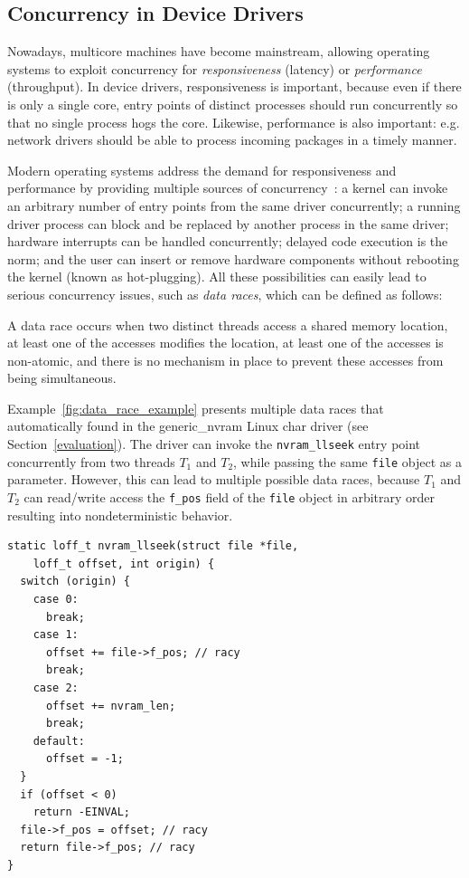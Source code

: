 \subsection{Concurrency in Device Drivers}
\label{bg:concurrency}

Nowadays, multicore machines have become mainstream, allowing operating systems to exploit concurrency for \emph{responsiveness} (latency) or \emph{performance} (throughput). In device drivers, responsiveness is important, because even if there is only a single core, entry points of distinct processes should run concurrently so that no single process hogs the core. Likewise, performance is also important: e.g. network drivers should be able to process incoming packages in a timely manner.

Modern operating systems address the demand for responsiveness and performance by providing multiple sources of concurrency~\cite{corbet2005linux}: a kernel can invoke an arbitrary number of entry points from the same driver concurrently; a running driver process can block and be replaced by another process in the same driver; hardware interrupts can be handled concurrently; delayed code execution is the norm; and the user can insert or remove hardware components without rebooting the kernel (known as hot-plugging). All these possibilities can easily lead to serious concurrency issues, such as \emph{data races}, which can be defined as follows:

\begin{definition}
\label{definition:datarace}
A data race occurs when two distinct threads access a shared memory location, at least one of the accesses modifies the location, at least one of the accesses is non-atomic, and there is no mechanism in place to prevent these accesses from being simultaneous.
\end{definition}

Example~\ref{fig:data_race_example} presents multiple data races that \whoop automatically found in the generic\_nvram Linux char driver (see Section~\ref{evaluation}). The driver can invoke the \texttt{nvram\_llseek} entry point concurrently from two threads $T_1$ and $T_2$, while passing the same \texttt{file} object as a parameter. However, this can lead to multiple possible data races, because $T_1$ and $T_2$ can read/write access the \texttt{f\_pos} field of the \texttt{file} object in arbitrary order resulting into nondeterministic behavior.

\begin{lstlisting}[caption = Data races in the generic\_nvram char driver that \whoop found., label = fig:data_race_example]
static loff_t nvram_llseek(struct file *file,
    loff_t offset, int origin) {
  switch (origin) {
    case 0:
      break;
    case 1:
      offset += file->f_pos; // racy
      break;
    case 2:
      offset += nvram_len;
      break;
    default:
      offset = -1;
  }
  if (offset < 0)
    return -EINVAL;
  file->f_pos = offset; // racy
  return file->f_pos; // racy
}
\end{lstlisting}

